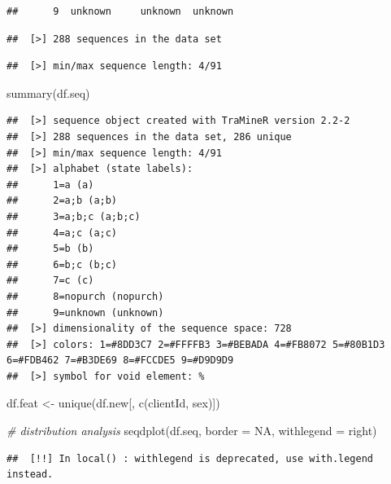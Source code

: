 \documentclass[
]{book}
\newenvironment{Shaded}{\begin{snugshade}}{\end{snugshade}}
\newcommand{\AttributeTok}[1]{\textcolor[rgb]{0.77,0.63,0.00}{#1}}
\newcommand{\CommentTok}[1]{\textcolor[rgb]{0.56,0.35,0.01}{\textit{#1}}}
\newcommand{\ConstantTok}[1]{\textcolor[rgb]{0.00,0.00,0.00}{#1}}
\newcommand{\FunctionTok}[1]{\textcolor[rgb]{0.00,0.00,0.00}{#1}}
\newcommand{\NormalTok}[1]{#1}
\newcommand{\OtherTok}[1]{\textcolor[rgb]{0.56,0.35,0.01}{#1}}
\newcommand{\StringTok}[1]{\textcolor[rgb]{0.31,0.60,0.02}{#1}}
\begin{document}
\begin{verbatim}
##      9  unknown     unknown  unknown
\end{verbatim}

\begin{verbatim}
##  [>] 288 sequences in the data set
\end{verbatim}

\begin{verbatim}
##  [>] min/max sequence length: 4/91
\end{verbatim}

\begin{Shaded}
\begin{Highlighting}[]
\FunctionTok{summary}\NormalTok{(df.seq)}
\end{Highlighting}
\end{Shaded}

\begin{verbatim}
##  [>] sequence object created with TraMineR version 2.2-2 
##  [>] 288 sequences in the data set, 286 unique 
##  [>] min/max sequence length: 4/91
##  [>] alphabet (state labels):  
##      1=a (a)
##      2=a;b (a;b)
##      3=a;b;c (a;b;c)
##      4=a;c (a;c)
##      5=b (b)
##      6=b;c (b;c)
##      7=c (c)
##      8=nopurch (nopurch)
##      9=unknown (unknown)
##  [>] dimensionality of the sequence space: 728 
##  [>] colors: 1=#8DD3C7 2=#FFFFB3 3=#BEBADA 4=#FB8072 5=#80B1D3 6=#FDB462 7=#B3DE69 8=#FCCDE5 9=#D9D9D9 
##  [>] symbol for void element: %
\end{verbatim}

\begin{Shaded}
\begin{Highlighting}[]
\NormalTok{df.feat }\OtherTok{\textless{}{-}} \FunctionTok{unique}\NormalTok{(df.new[, }\FunctionTok{c}\NormalTok{(}\StringTok{\textquotesingle{}clientId\textquotesingle{}}\NormalTok{, }\StringTok{\textquotesingle{}sex\textquotesingle{}}\NormalTok{)])}

\CommentTok{\# distribution analysis}
\FunctionTok{seqdplot}\NormalTok{(df.seq, }\AttributeTok{border =} \ConstantTok{NA}\NormalTok{, }\AttributeTok{withlegend =} \StringTok{\textquotesingle{}right\textquotesingle{}}\NormalTok{)}
\end{Highlighting}
\end{Shaded}

\begin{verbatim}
##  [!!] In local() : withlegend is deprecated, use with.legend instead.
\end{verbatim}
\end{document}
